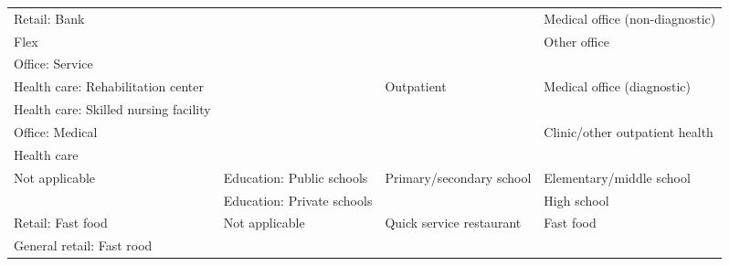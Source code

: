 \begin{table}
\begin{tabular}{|p{4.25cm}|p{3.5cm}|p{3.25cm}|p{4.25cm}|}
Retail: Bank                                          &                                                 &                                           & Medical office (non-diagnostic)                 \\ \cline{1-1} \cline{4-4}
Flex                                                  &                                                 &                                           & \multirow{2}{*}{Other office}                   \\ \cline{1-1}
Office: Service                                       &                                                 &                                           &                                                 \\ \cline{1-1} \cline{3-4}
Health care: Rehabilitation   center                  &                                                 & \multirow{4}{*}{Outpatient}               & \multirow{2}{*}{Medical office (diagnostic)}    \\ \cline{1-1}
Health care: Skilled nursing   facility               &                                                 &                                           &                                                 \\ \cline{1-1} \cline{4-4}
Office: Medical                                       &                                                 &                                           & \multirow{2}{*}{Clinic/other outpatient health} \\ \cline{1-1}
Health care                                           &                                                 &                                           &                                                 \\ \hline
\multicolumn{1}{|l|}{\multirow{2}{*}{Not applicable}} & \multicolumn{1}{l|}{Education: Public schools}  & \multirow{2}{*}{Primary/secondary school} & Elementary/middle school                        \\ \cline{2-2} \cline{4-4}
\multicolumn{1}{|c|}{}                                & \multicolumn{1}{l|}{Education: Private schools} &                                           & High school                                     \\ \hline
Retail: Fast food                                     & \multirow{25}{*}{Not applicable}                & \multirow{2}{*}{Quick service restaurant} & \multirow{2}{*}{Fast food}                      \\ \cline{1-1}
General retail: Fast rood                             &                                                 &                                           &                                                 \\ \cline{1-1} \cline{3-4}

\end{tabular}
\end{table}
